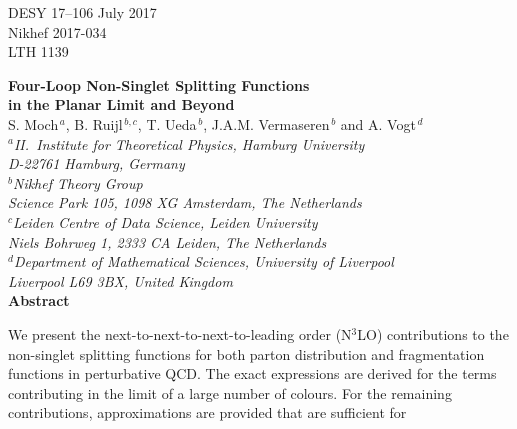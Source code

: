 \documentclass[12pt]{article}
\begin{document}
\setlength{\parskip}{0.2cm}
\setlength{\baselineskip}{0.55cm}

\begin{titlepage}
\noindent
DESY 17--106 \hfill July 2017\\
Nikhef 2017-034 \\
LTH 1139 \\
\vspace{0.6cm}
%
\begin{center}
{\LARGE \bf Four-Loop Non-Singlet Splitting Functions\\[1ex]
  in the Planar Limit and Beyond}\\ 
\vspace{1.4cm}
%
\large
%
S. Moch$^{\, a}$, B. Ruijl$^{\, b,c}$, T. Ueda$^{\, b}$, 
J.A.M. Vermaseren$^{\, b}$ and A. Vogt$^{\, d}$\\
\vspace{1.4cm}
%
\normalsize
{\it $^a$II.~Institute for Theoretical Physics, Hamburg University\\
\vspace{0.1cm}
D-22761 Hamburg, Germany}\\
\vspace{0.5cm}
{\it $^b$Nikhef Theory Group \\
\vspace{0.1cm}
Science Park 105, 1098 XG Amsterdam, The Netherlands} \\
\vspace{0.5cm}
{\it $^c$Leiden Centre of Data Science, Leiden University \\
\vspace{0.1cm}
Niels Bohrweg 1, 2333 CA Leiden, The Netherlands}\\
\vspace{0.5cm}
{\it $^d$Department of Mathematical Sciences, University of Liverpool\\
\vspace{0.1cm}
Liverpool L69 3BX, United Kingdom}\\
\vspace{1.4cm}
%
{\large \bf Abstract}
\vspace{-0.2cm}
\end{center}
%
We present the next-to-next-to-next-to-leading order (N$^3$LO) contributions 
to the non-singlet splitting functions for both parton distribution and 
fragmentation functions in perturbative QCD.  The exact expressions are derived
for the terms contributing in the limit of a large number of colours.  For the 
remaining contributions, approximations are provided that are sufficient for 

\end{titlepage}
\end{document}
